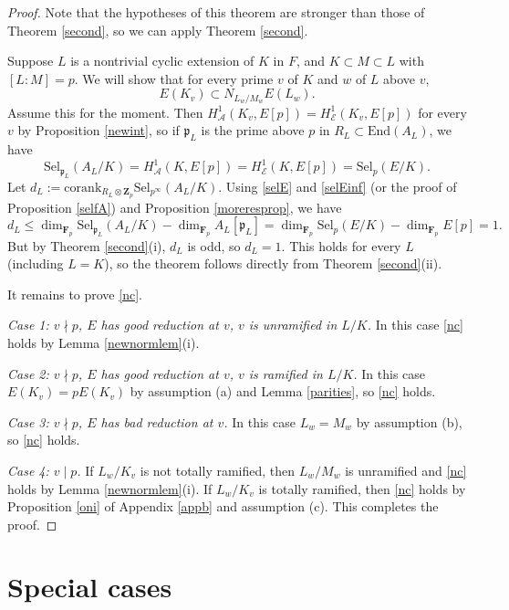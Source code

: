 \documentclass[reqno]{amsart}
\theoremstyle{definition}
\def\Z{\mathbf{Z}}
\def\F{\mathbf{F}}
\def\Zp{\Z_p}
\def\Fp{\F_p}
\def\A{\mathcal{A}}
\def\E{\mathcal{E}}
\def\P{\mathfrak{p}}
\def\cork{\mathrm{corank}}
\def\End{\mathrm{End}}
\def\Sel{\mathrm{Sel}}
\def\Hs#1{H^1_{#1}}
\def\HE{\Hs{\E}}
\def\HA{\Hs{\A}}
\begin{document}
\begin{proof}
Note that the hypotheses of this theorem are stronger than those 
of Theorem \ref{second}, so we can apply Theorem \ref{second}.

Suppose $L$ is a nontrivial cyclic extension of $K$ in $F$, 
and $K \subset M \subset L$ with $[L:M] = p$.  
We will show that for every prime $v$ of $K$ and $w$ of $L$ above $v$, 
\begin{equation}
\label{nc}
E(K_v) \subset N_{L_w/M_w} E(L_w).
\end{equation}
Assume this for the moment.  Then  
$\HA(K_v,E[p]) = \HE(K_v,E[p])$ for every $v$ by Proposition \ref{newint}, so 
if $\P_L$ is the prime above $p$ in $R_L \subset \End(A_L)$, 
we have
$$
\Sel_{\P_L}(A_L/K) = \HA(K,E[p]) = \HE(K,E[p]) = \Sel_p(E/K).
$$
Let $d_L := \cork_{R_L \otimes \Zp}\Sel_{p^\infty}(A_L/K)$.  
Using \eqref{selE} and \eqref{selEinf} (or the proof of 
Proposition \ref{selfA}) and Proposition \ref{moreresprop}, we have
$$
d_L \le \dim_{\Fp}\Sel_{\P_L}(A_L/K) - \dim_{\Fp}A_L[\P_L] = \dim_{\Fp}\Sel_p(E/K) 
    - \dim_{\Fp} E[p] = 1.
$$
But by Theorem \ref{second}(i), $d_L$ is odd, so $d_L = 1$.  
This holds for every $L$ (including $L = K$), so
the theorem follows directly from Theorem \ref{second}(ii).

It remains to prove \eqref{nc}.   

{\em Case 1:  $v \nmid p$, $E$ has good reduction at $v$, 
$v$ is unramified in $L/K$.} 
In this case \eqref{nc} holds by Lemma \ref{newnormlem}(i).

{\em Case 2: $v \nmid p$, $E$ has good reduction at $v$, 
$v$  is ramified in $L/K$.} 
In this case $E(K_v) = pE(K_v)$ 
by assumption (a) and Lemma \ref{parities}, so \eqref{nc} holds.

{\em Case 3:  $v \nmid p$, $E$ has bad reduction at $v$.} 
In this case $L_w = M_w$ by assumption (b), so 
\eqref{nc} holds.
 
{\em Case 4:  $v \mid p$.}  
If $L_w/K_v$ is not totally ramified, then $L_w/M_w$ is unramified 
and \eqref{nc} holds by Lemma \ref{newnormlem}(i).  If 
$L_w/K_v$ is totally ramified, then \eqref{nc} holds by 
Proposition \ref{oni} of Appendix \ref{appb} and assumption (c).
This completes the proof.
\end{proof}


\section{Special cases}
\label{examples}
\end{document}
